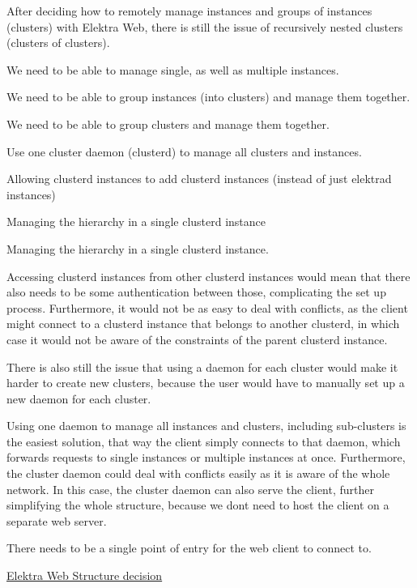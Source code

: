 After deciding how to remotely manage instances and groups of instances (clusters) with Elektra Web, there is still the issue of recursively nested clusters (clusters of clusters).


\begin{DoxyItemize}
\item We need to be able to manage single, as well as multiple instances.
\item We need to be able to group instances (into clusters) and manage them together.
\item We need to be able to group clusters and manage them together.
\end{DoxyItemize}


\begin{DoxyItemize}
\item Use one cluster daemon (clusterd) to manage all clusters and instances.
\end{DoxyItemize}


\begin{DoxyItemize}
\item Allowing clusterd instances to add clusterd instances (instead of just elektrad instances)
\item Managing the hierarchy in a single clusterd instance
\end{DoxyItemize}

Managing the hierarchy in a single clusterd instance.

Accessing clusterd instances from other clusterd instances would mean that there also needs to be some authentication between those, complicating the set up process. Furthermore, it would not be as easy to deal with conflicts, as the client might connect to a clusterd instance that belongs to another clusterd, in which case it would not be aware of the constraints of the parent clusterd instance.

There is also still the issue that using a daemon for each cluster would make it harder to create new clusters, because the user would have to manually set up a new daemon for each cluster.

Using one daemon to manage all instances and clusters, including sub-\/clusters is the easiest solution, that way the client simply connects to that daemon, which forwards requests to single instances or multiple instances at once. Furthermore, the cluster daemon could deal with conflicts easily as it is aware of the whole network. In this case, the cluster daemon can also serve the client, further simplifying the whole structure, because we don\textquotesingle{}t need to host the client on a separate web server.


\begin{DoxyItemize}
\item There needs to be a single point of entry for the web client to connect to.
\end{DoxyItemize}


\begin{DoxyItemize}
\item \hyperlink{doc_decisions_elektra_web_md}{Elektra Web Structure decision}
\end{DoxyItemize}